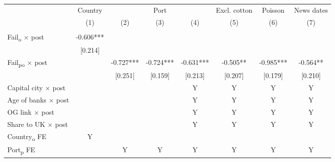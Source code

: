 {
\def\sym#1{\ifmmode^{#1}\else\(^{#1}\)\fi}
\begin{tabular}{l*{7}{c}}
\toprule
            &\multicolumn{1}{c}{Country}&\multicolumn{3}{c}{Port}                       &\multicolumn{1}{c}{Excl. cotton}&\multicolumn{1}{c}{Poisson}&\multicolumn{1}{c}{News dates}\\\cmidrule(lr){2-2}\cmidrule(lr){3-5}\cmidrule(lr){6-6}\cmidrule(lr){7-7}\cmidrule(lr){8-8}
            &\multicolumn{1}{c}{(1)}   &\multicolumn{1}{c}{(2)}   &\multicolumn{1}{c}{(3)}   &\multicolumn{1}{c}{(4)}   &\multicolumn{1}{c}{(5)}   &\multicolumn{1}{c}{(6)}   &\multicolumn{1}{c}{(7)}   \\
\midrule
            &               &               &               &               &               &               &               \\
Fail\textsubscript{o} $\times$ post&      -0.606***&               &               &               &               &               &               \\
            &     [0.214]   &               &               &               &               &               &               \\
Fail\textsubscript{po} $\times$ post&               &      -0.727***&      -0.724***&      -0.631***&      -0.505** &      -0.985***&      -0.564** \\
            &               &     [0.251]   &     [0.159]   &     [0.213]   &     [0.207]   &     [0.179]   &     [0.210]   \\
Capital city $\times$ post &               &               &               &           Y   &           Y   &           Y   &           Y   \\
Age of banks $\times$ post&               &               &               &           Y   &           Y   &           Y   &           Y   \\
OG link $\times$ post&               &               &               &           Y   &           Y   &           Y   &           Y   \\
Share to UK $\times$ post &               &               &               &           Y   &           Y   &           Y   &           Y   \\
Country\textsubscript{o} FE &           Y   &               &               &               &               &               &               \\
Port\textsubscript{p} FE &               &           Y   &           Y   &           Y   &           Y   &           Y   &           Y   \\

\end{tabular}}
